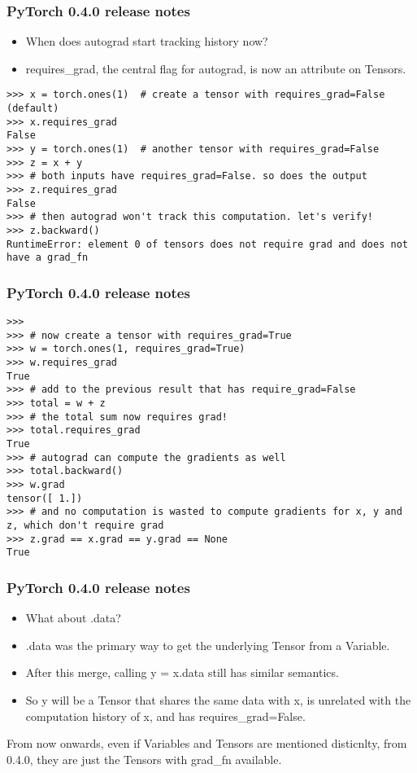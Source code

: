 \begin{frame}[fragile]
\frametitle{PyTorch 0.4.0 release notes}

\begin{itemize}
\item When does autograd start tracking history now?
\item requires\_grad, the central flag for autograd, is now an attribute on Tensors.
\end{itemize}
 \begin{lstlisting}
>>> x = torch.ones(1)  # create a tensor with requires_grad=False (default)
>>> x.requires_grad
False
>>> y = torch.ones(1)  # another tensor with requires_grad=False
>>> z = x + y
>>> # both inputs have requires_grad=False. so does the output
>>> z.requires_grad
False
>>> # then autograd won't track this computation. let's verify!
>>> z.backward()
RuntimeError: element 0 of tensors does not require grad and does not have a grad_fn
\end{lstlisting}
\end{frame} 
 
\begin{frame}[fragile]
\frametitle{PyTorch 0.4.0 release notes}

 \begin{lstlisting}
>>>
>>> # now create a tensor with requires_grad=True
>>> w = torch.ones(1, requires_grad=True)
>>> w.requires_grad
True
>>> # add to the previous result that has require_grad=False
>>> total = w + z
>>> # the total sum now requires grad!
>>> total.requires_grad
True
>>> # autograd can compute the gradients as well
>>> total.backward()
>>> w.grad
tensor([ 1.])
>>> # and no computation is wasted to compute gradients for x, y and z, which don't require grad
>>> z.grad == x.grad == y.grad == None
True
\end{lstlisting}
\end{frame} 
 
\begin{frame}[fragile]
\frametitle{PyTorch 0.4.0 release notes}

\begin{itemize}
\item What about .data?
\item .data was the primary way to get the underlying Tensor from a Variable. 
\item After this merge, calling y = x.data still has similar semantics.
\item So y will be a Tensor that shares the same data with x, is unrelated with the computation history of x, and has requires\_grad=False.
\end{itemize}

From now onwards, even if Variables and Tensors are mentioned disticnlty, from 0.4.0, they are just the Tensors with grad\_fn available.
\end{frame} 
 
